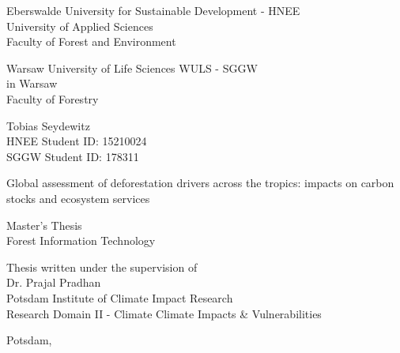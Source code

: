 \begin{titlepage}
	\begin{singlespace}
		\begin{center}
			\Large{Eberswalde University for Sustainable Development - HNEE}\\
			\Large{University of Applied Sciences}\\
			\Large{Faculty of Forest and Environment}
			
			\smallskip

			\Large{Warsaw University of Life Sciences WULS - SGGW}\\
			\Large{in Warsaw}\\
			\Large{Faculty of Forestry}

			\bigskip

			\large{Tobias Seydewitz}\\
			\normalsize{HNEE Student ID: 15210024}\\
			\normalsize{SGGW Student ID: 178311}

			\vspace{2cm}
 
			 \huge{Global assessment of deforestation drivers across the tropics: impacts on carbon stocks and ecosystem services}

			\bigskip

			\large{Master's Thesis}\\
			\large{Forest Information Technology}

			\vspace{2cm}

			\begin{flushright}
				\normalsize{Thesis written under the supervision of}\\
				\normalsize{Dr. Prajal Pradhan}\\
				\normalsize{Potsdam Institute of Climate Impact Research}\\
				\normalsize{Research Domain II - Climate Climate Impacts \& Vulnerabilities}
			\end{flushright}

			\vspace{5cm}

			\normalsize{Potsdam, \the\year}
		\end{center}
	\end{singlespace}
\end{titlepage}